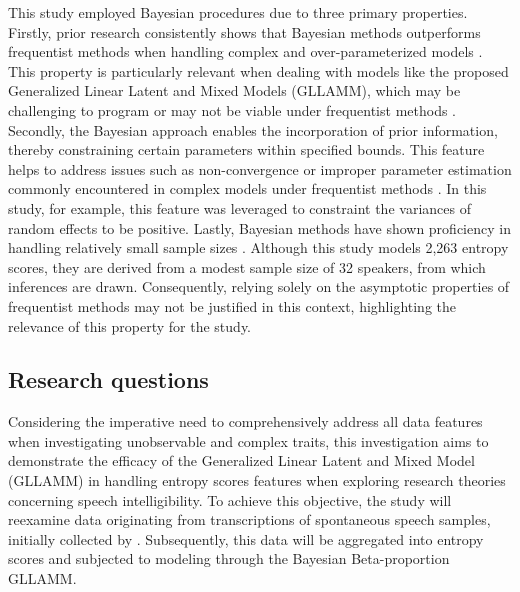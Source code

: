 \documentclass[
  authoryear,
  preprint,
  1p]{elsarticle}
\begin{document}
{This study employed Bayesian procedures due to three primary
properties. Firstly, prior research consistently shows that Bayesian
methods outperforms frequentist methods when handling complex and
over-parameterized models \citep{Baker_1998, Kim_et_al_1999}. This
property is particularly relevant when dealing with models like the
proposed Generalized Linear Latent and Mixed Models (GLLAMM), which may
be challenging to program or may not be viable under frequentist methods
\citep{Depaoli_2014}. Secondly, the Bayesian approach enables the
incorporation of prior information, thereby constraining certain
parameters within specified bounds. This feature helps to address issues
such as non-convergence or improper parameter estimation commonly
encountered in complex models under frequentist methods
\citep{Martin_et_al_1975, Seaman_et_al_2011}. In this study, for
example, this feature was leveraged to constraint the variances of
random effects to be positive. Lastly, Bayesian methods have shown
proficiency in handling relatively small sample sizes
\citep{Baldwin_et_al_2013, Lambert_et_al_2005, Depaoli_2014}. Although
this study models 2,263 entropy scores, they are derived from a modest
sample size of 32 speakers, from which inferences are drawn.
Consequently, relying solely on the asymptotic properties of frequentist
methods may not be justified in this context, highlighting the relevance
of this property for the study.}

\subsection{Research questions}\label{sec-I-RQ}

Considering the imperative need to comprehensively address all data
features when investigating unobservable and complex traits, this
investigation aims to demonstrate the efficacy of the Generalized Linear
Latent and Mixed Model (GLLAMM) in handling entropy scores features when
exploring research theories concerning speech intelligibility. To
achieve this objective, the study will reexamine data originating from
transcriptions of spontaneous speech samples, initially collected by
\citet{Boonen_et_al_2021}. Subsequently, this data will be aggregated
into entropy scores and subjected to modeling through the Bayesian
Beta-proportion GLLAMM.
\end{document}
